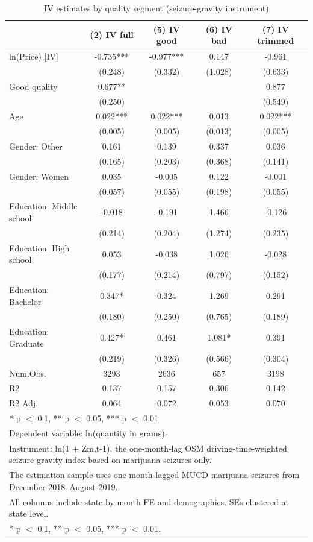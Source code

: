 \begin{table}[H]
\centering
\caption{IV estimates by quality segment (seizure-gravity instrument)}
\label{tab:iv-gravity-quality}
\centering
\begin{tabular}[t]{lcccc}
\toprule
  & (2) IV full & (5) IV good & (6) IV bad & (7) IV trimmed\\
\midrule
ln(Price) [IV] & -0.735*** & -0.977*** & 0.147 & -0.961\\
 & (0.248) & (0.332) & (1.028) & (0.633)\\
Good quality & 0.677** &  &  & 0.877\\
 & (0.250) &  &  & (0.549)\\
Age & 0.022*** & 0.022*** & 0.013 & 0.022***\\
 & (0.005) & (0.005) & (0.013) & (0.005)\\
Gender: Other & 0.161 & 0.139 & 0.337 & 0.036\\
 & (0.165) & (0.203) & (0.368) & (0.141)\\
Gender: Women & 0.035 & -0.005 & 0.122 & -0.001\\
 & (0.057) & (0.055) & (0.198) & (0.055)\\
Education: Middle school & -0.018 & -0.191 & 1.466 & -0.126\\
 & (0.214) & (0.204) & (1.274) & (0.235)\\
Education: High school & 0.053 & -0.038 & 1.026 & -0.028\\
 & (0.177) & (0.214) & (0.797) & (0.152)\\
Education: Bachelor & 0.347* & 0.324 & 1.269 & 0.291\\
 & (0.180) & (0.250) & (0.765) & (0.189)\\
Education: Graduate & 0.427* & 0.461 & 1.081* & 0.391\\
 & (0.219) & (0.326) & (0.566) & (0.304)\\
\midrule
Num.Obs. & 3293 & 2636 & 657 & 3198\\
R2 & 0.137 & 0.157 & 0.306 & 0.142\\
R2 Adj. & 0.064 & 0.072 & 0.053 & 0.070\\
\bottomrule
\multicolumn{5}{l}{\rule{0pt}{1em}* p $<$ 0.1, ** p $<$ 0.05, *** p $<$ 0.01}\\
\multicolumn{5}{l}{\rule{0pt}{1em}Dependent variable: ln(quantity in grams).}\\
\multicolumn{5}{l}{\rule{0pt}{1em}Instrument: ln(1 + Zm,t-1), the one-month-lag OSM driving-time-weighted seizure-gravity index based on marijuana seizures only.}\\
\multicolumn{5}{l}{\rule{0pt}{1em}The estimation sample uses one-month-lagged MUCD marijuana seizures from December 2018--August 2019.}\\
\multicolumn{5}{l}{\rule{0pt}{1em}All columns include state-by-month FE and demographics. SEs clustered at state level.}\\
\multicolumn{5}{l}{\rule{0pt}{1em}* p $<$ 0.1, ** p $<$ 0.05, *** p $<$ 0.01.}\\
\end{tabular}
\end{table}
